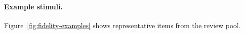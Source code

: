 \paragraph{Example stimuli.} Figure~\ref{fig:fidelity-examples} shows representative items from the review pool.

